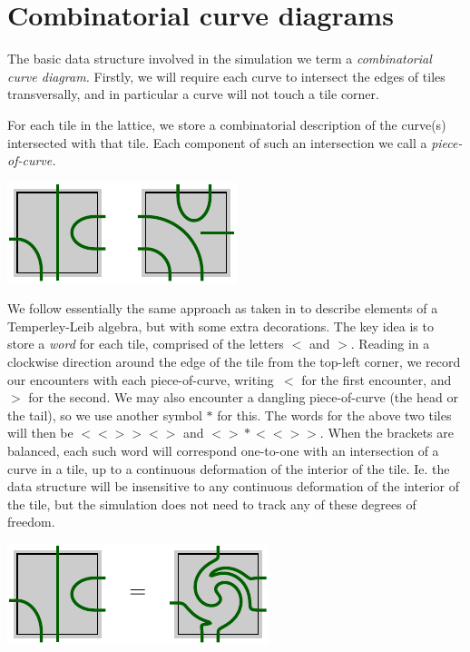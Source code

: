 \documentclass[aps, prl, letterpaper, twocolumn, superscriptaddress, notitlepage, 10pt]{revtex4-1}
\begin{document}
%
%

\section{Combinatorial curve diagrams}

The basic data structure involved in the
simulation we term a \emph{combinatorial curve
diagram.}
Firstly, we will require each curve to intersect 
the edges of tiles transversally,
and in particular a curve will not touch a tile corner.

For each tile in the lattice,
we store a combinatorial
description of the curve(s) intersected with that tile.
Each component of such an intersection we call a \emph{piece-of-curve.}
\begin{center}
\includegraphics[]{pic-cells.pdf}
\end{center}

We follow essentially the same approach as taken in \cite{Abramsky2007} 
to describe elements of a Temperley-Leib algebra, but
with some extra decorations.
The key idea is to store a \emph{word} for each tile, comprised of
the letters $\bigl<$ and $\bigr>$.
Reading in a clockwise direction around the edge of
the tile from the top-left corner,
we record our encounters with each piece-of-curve,
writing~$\bigl<$ for the first encounter, and~$\bigr>$ for the
second.
We may also encounter a dangling piece-of-curve
(the head or the tail), so we use another symbol $*$ for this.
The words for the above two tiles will then be 
$\bigl<\bigl<\bigr>\bigr>\bigl<\bigr>$ and $\bigl<\bigr>*\bigl<\bigl<\bigr>\bigr>.$
When the brackets are balanced,
each such word will correspond one-to-one with an intersection
of a curve in a tile, up to a continuous deformation of the interior of the tile.
Ie. the data structure 
will be insensitive to any continuous deformation of the interior of the tile,
but the simulation does not need to track any of these degrees of freedom.

\begin{center}
\includegraphics[]{pic-cells-0.pdf}
\end{center}
\end{document}
